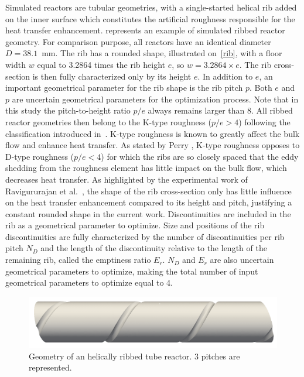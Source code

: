 Simulated reactors are tubular geometries, with a single-started helical rib added on the inner surface which constitutes the artificial roughness responsible for the heat transfer enhancement.  represents an example of simulated ribbed reactor geometry. For comparison purpose, all reactors have an identical diameter $D=38.1$~mm. The rib has a rounded shape, illustrated on~\cref{rib}, with a floor width $w$ equal to 3.2864 times the rib height $e$, so $w=3.2864 \times e$. The rib cross-section is then fully characterized only by its height $e$. In addition to $e$, an important geometrical parameter for the rib shape is the rib pitch $p$. Both $e$ and $p$ are uncertain geometrical parameters for the optimization process. Note that in this study the pitch-to-height ratio $p/e$ always remains larger than 8. All ribbed reactor geometries then belong to the K-type roughness ($p/e > 4$) following the classification introduced in~\cite{jimenez2004, nagano2004}. K-type roughness is known to greatly affect the bulk flow and enhance heat transfer. As stated by Perry \cite{perry1969}, K-type roughness opposes to D-type roughness ($p/e < 4$) for which the ribs are so closely spaced that the eddy shedding from the roughness element has little impact on the bulk flow, which decreases heat transfer. As highlighted by the experimental work of Ravigururajan et al.~\cite{ravigururajan1996}, the shape of the rib cross-section only has little influence on the heat transfer enhancement compared to its height and pitch, justifying a constant rounded shape in the current work. Discontinuities are included in the rib as a geometrical parameter to optimize. Size and positions of the rib discontinuities are fully characterized by the number of discontinuities per rib pitch $N_D$ and the length of the discontinuity relative to the length of the remaining rib, called the emptiness ratio $E_r$. $N_D$ and $E_r$ are also uncertain geometrical parameters to optimize, making the total number of input geometrical parameters to optimize equal to 4.

\begin{figure}[ht]
\centering
\includegraphics[width=0.8\linewidth]{fig/applications/optim/geometry.png}
\caption{Geometry of an helically ribbed tube reactor. 3 pitches are represented.}
\label{geometry}
\end{figure}

